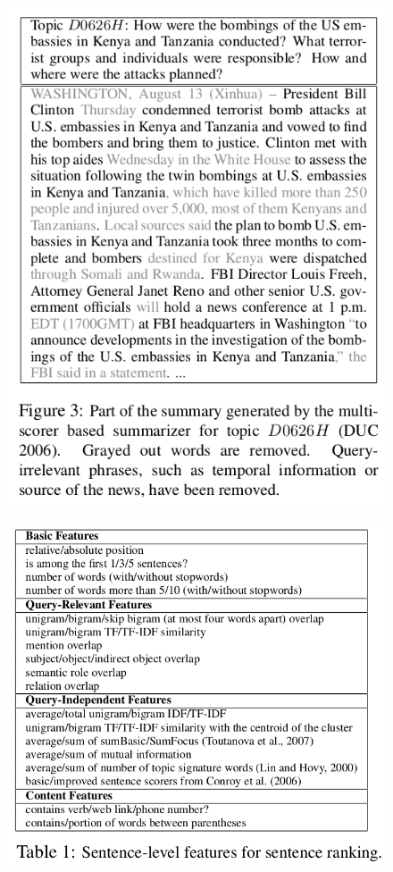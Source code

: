 \documentclass[xcolor={table}]{beamer}
\begin{document}
\begin{frame}{\cite{wang2013sentence}}
\begin{figure}[h]
\centering
\includegraphics[scale=.27]{images/figure3-wang13} 
\end{figure}
\end{frame}

\begin{frame}{\cite{wang2013sentence}}
\begin{figure}[h]
\centering
\includegraphics[scale=.3]{images/table1-wang13} 
\end{figure}
\end{frame}
\end{document}
